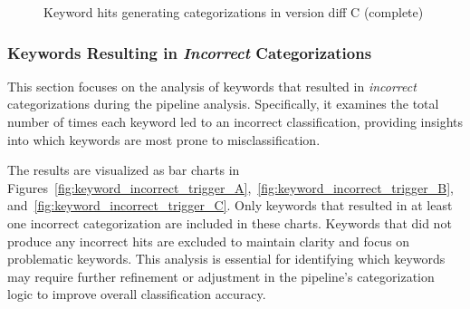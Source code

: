 \begin{figure}[H]
    \centering
    \caption{Keyword hits generating categorizations in version diff C (complete)}
    \label{fig:commonly_used_words_C}
\end{figure}



\subsubsection{Keywords Resulting in \textit{Incorrect} Categorizations}

This section focuses on the analysis of keywords that resulted in \textit{incorrect} categorizations during the pipeline analysis. Specifically, it examines the total number of times each keyword led to an incorrect classification, providing insights into which keywords are most prone to misclassification.

The results are visualized as bar charts in Figures~\ref{fig:keyword_incorrect_trigger_A},~\ref{fig:keyword_incorrect_trigger_B},~and~\ref{fig:keyword_incorrect_trigger_C}. Only keywords that resulted in at least one incorrect categorization are included in these charts. Keywords that did not produce any incorrect hits are excluded to maintain clarity and focus on problematic keywords. This analysis is essential for identifying which keywords may require further refinement or adjustment in the pipeline’s categorization logic to improve overall classification accuracy.



